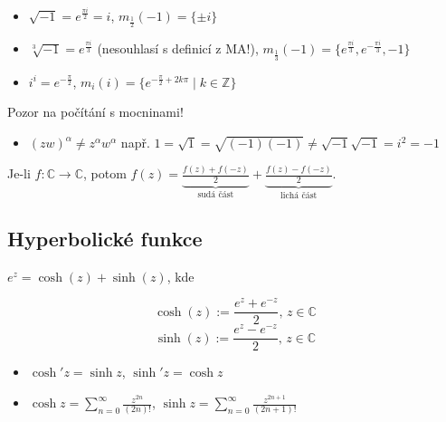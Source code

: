 \newpage
\begin{example}
\mbox{}
\begin{itemize}
    \item $\sqrt{-1}=e^{\frac{\pi i}{2}}=i$,  $m_{\frac{1}{2}}(-1)=\{\pm i\}$
    \item $\sqrt[3]{-1}=e^{\frac{\pi i}{3}}$ (nesouhlasí s definicí z MA!),  $m_{\frac{1}{3}}(-1)=\{e^{\frac{\pi i}{3}},e^{-\frac{\pi i}{3}},-1\} $
    \item  $i^i=e^{-\frac{\pi }{2}}$, 
    $m_{i}(i)=\{e^{-\frac{\pi }{2}+2k\pi}\mid k\in\mathbb{Z}\}$
\end{itemize}

 \vspace{5mm}
 Pozor na počítání s mocninami!%
 \begin{itemize}
    \item$(zw)^{\alpha}\neq z^{\alpha}w^{\alpha}$ \newline
 např. $1=\sqrt{1}=\sqrt{(-1)(-1)}\neq \sqrt{-1}\sqrt{-1}=i^2=-1$
 \end{itemize}
\end{example}

\begin{note}
Je-li $f \colon \mathbb{C} \to \mathbb{C}$, potom $f(z)=\underset{\text{sudá část}}{\underbrace{\frac{f(z)+f(-z)}{2}}}+\underset{\text{lichá část}}{\underbrace{\frac{f(z)-f(-z)}{2}}}$.
\end{note}

\subsection{Hyperbolické funkce}

$e^{z}=\cosh(z)+\sinh(z)$, kde

\begin{definition}
\[\cosh(z):=\frac{e^{z}+e^{-z}}{2}\text{, }z\in \mathbb{C}\] \newline
\[\sinh(z):=\frac{e^{z}-e^{-z}}{2}\text{, }z\in \mathbb{C}\]
\end{definition}


\begin{properties}
\mbox{}
\vspace{-2em}
\begin{itemize}
    \item $\cosh'{z}=\sinh{z}$, $\sinh'{z}=\cosh{z}$
    \item $\cosh{z}=\sum_{n=0}^{\infty}\frac{z^{2n}}{(2n)!}$, $\sinh{z}=\sum_{n=0}^{\infty}\frac{z^{2n+1}}{(2n+1)!}$
\end{itemize}
\end{properties}

